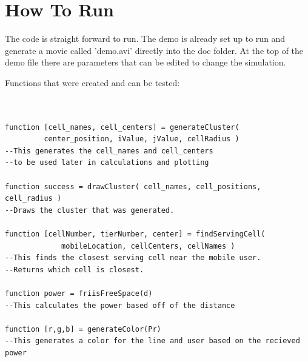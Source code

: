 \documentclass{article}
\begin{document}
\section{How To Run}\label{run}

The code is straight forward to run. The demo is already set up to run and generate a movie called 'demo.avi' directly into the doc folder. At the top of the demo file there are parameters that can be edited to change the simulation.

Functions that were created and can be tested:
\begin{verbatim}


function [cell_names, cell_centers] = generateCluster(
		 center_position, iValue, jValue, cellRadius )
--This generates the cell_names and cell_centers
--to be used later in calculations and plotting

function success = drawCluster( cell_names, cell_positions, cell_radius )
--Draws the cluster that was generated.

function [cellNumber, tierNumber, center] = findServingCell(
			 mobileLocation, cellCenters, cellNames )
--This finds the closest serving cell near the mobile user. 
--Returns which cell is closest.

function power = friisFreeSpace(d)
--This calculates the power based off of the distance

function [r,g,b] = generateColor(Pr)
--This generates a color for the line and user based on the recieved power

\end{verbatim}


%
%
%
%

\end{document}
